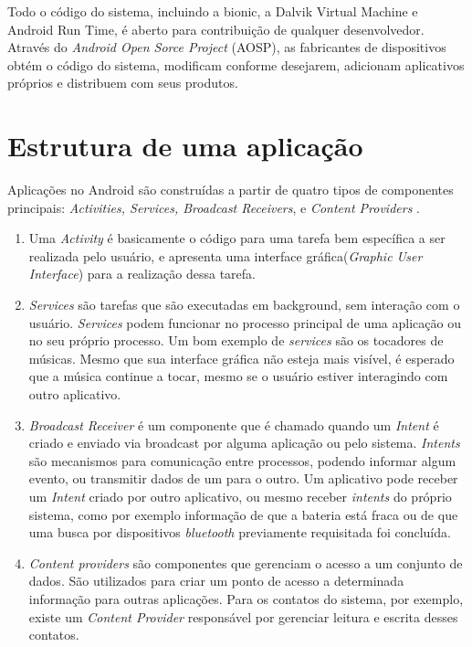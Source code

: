 Todo o código do sistema, incluindo a bionic, a Dalvik Virtual Machine e Android Run Time, é aberto para contribuição de qualquer desenvolvedor. Através do \textit{Android Open Sorce Project} (AOSP), as fabricantes de dispositivos obtém o código do sistema, modificam conforme desejarem, adicionam aplicativos próprios e distribuem com seus produtos.

\section{Estrutura de uma aplicação}

Aplicações no Android são construídas a partir de quatro tipos de componentes principais: \textit{Activities, Services, Broadcast Receivers}, e \textit{Content Providers} \cite{heuser2014}. 

\begin{enumerate}
\item Uma \textit{Activity} é basicamente o código para uma tarefa bem específica a ser realizada pelo usuário, e apresenta uma interface gráfica(\textit{Graphic User Interface}) para a realização dessa tarefa.

\item \textit{Services} são tarefas que são executadas em background, sem interação com o usuário. \textit{Services} podem funcionar no processo principal de uma aplicação ou no seu próprio processo. Um bom exemplo de \textit{services} são os tocadores de músicas. Mesmo que sua interface gráfica não esteja mais visível, é esperado que a música continue a tocar, mesmo se o usuário estiver interagindo com outro aplicativo. 

\item \textit{Broadcast Receiver} é um componente que é chamado quando um \textit{Intent} é criado e enviado via broadcast por alguma aplicação ou pelo sistema. \textit{Intents} são mecanismos para comunicação entre processos, podendo informar algum evento, ou transmitir dados de um para o outro.
Um aplicativo pode receber um \textit{Intent} criado por outro aplicativo, ou mesmo receber \textit{intents} do próprio sistema, como por exemplo informação de que a bateria está fraca ou de que uma busca por dispositivos \textit{bluetooth} previamente requisitada foi concluída. 

\item \textit{Content providers} são componentes que gerenciam o acesso a um conjunto de dados. São utilizados para criar um ponto de acesso a determinada informação para outras aplicações. Para os contatos do sistema, por exemplo, existe um \textit{Content Provider} responsável por gerenciar leitura e escrita desses contatos. 
\end{enumerate}


